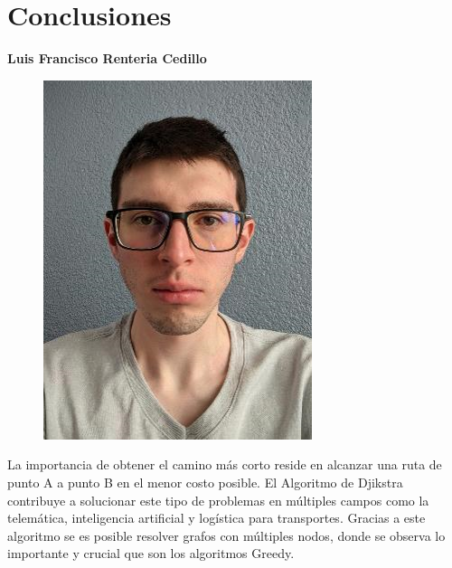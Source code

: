 \documentclass[12pt,twoside]{article}
\begin{document}
    \section{Conclusiones}
    \textbf{\large Luis Francisco Renteria Cedillo}
    \begin{figure}[H]
        \centering
        \includegraphics[angle=0, scale=0.5]{imagenes/foto1.png}
    \end{figure}
    La importancia de obtener el camino más corto reside en alcanzar una ruta de punto A a punto B en el menor costo posible. El Algoritmo de Djikstra contribuye a solucionar este tipo de problemas en múltiples campos como la telemática, inteligencia artificial y logística para transportes. Gracias a este algoritmo se es posible resolver grafos con múltiples nodos, donde se observa lo importante y crucial que son los algoritmos Greedy.\\
    
\end{document}
